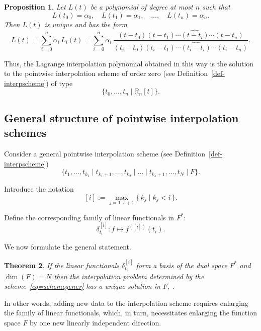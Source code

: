 \documentclass{article}
\newtheorem{theorem}{Theorem}[section]
\newtheorem{proposition}[theorem]{Proposition}	%
\theoremstyle{definition}
\theoremstyle{definition}
\numberwithin{figure}{section}
\newcommand{\1}{\mathbf{1}}
\begin{document}
\begin{proposition}\label{prop-Lagrpoly}
Let $L(t)$ be a polynomial of degree at most $n$ such that
\[
    L(t_0) = \alpha_0,\quad
    L(t_1) = \alpha_1,\quad
    \ldots,\quad
    L(t_n) = \alpha_n.
\]
Then $L(t)$ is unique and has the form
\[
    L(t)
    = \sum_{i=0}^n \alpha_i\, L_i(t)
    = \sum_{i=0}^n
        \alpha_i\,
        \frac{
            (t - t_0)(t - t_1)\cdots \widehat{(t - t_i)} \cdots (t - t_n)
        }{
            (t_i - t_0)(t_i - t_1)\cdots \widehat{(t_i - t_i)} \cdots (t_i - t_n)
        }.
\]
\end{proposition}

Thus, the Lagrange interpolation polynomial obtained in this way is the solution to the pointwise interpolation scheme of order zero (see Definition~\ref{def-interpscheme}) of type
\[
    \{t_0, \ldots, t_n \mid \mathbb{R}_n[t]\}.
\]

\subsection{General structure of pointwise interpolation schemes}\label{sec-generalschemeproperties}

Consider a general pointwise interpolation scheme (see Definition~\ref{def-interpscheme})
\begin{equation}\label{eq=schemegener}
     \{t_1,\ldots, t_{k_1}\mid t_{k_1+1},\ldots ,t_{k_2}\mid \ldots \mid t_{k_s+1},\ldots, t_{N} \mid F\}.
\end{equation}

Introduce the notation
\[
    [i] := \max_{j=1..s+1}\{\,k_j \mid k_j < i\,\}.
\]

Define the corresponding family of linear functionals in $F^*$:
\begin{equation}
    \delta^{[i]}_{t_i}\colon f \mapsto f^{([i])}(t_i).
\end{equation}

We now formulate the general statement.

\begin{theorem}\label{th-schemegeneral}
    If the linear functionals $\delta^{[i]}_{t_i}$ form a basis of the dual space $F^*$ and  $\dim(F)=N$ then the interpolation problem determined by the scheme~\eqref{eq=schemegener} has a unique solution in $F$, .
\end{theorem}

In other words, adding new data to the interpolation scheme requires enlarging the family of linear functionals, which, in turn, necessitates enlarging the function space $F$ by one new linearly independent direction.
\end{document}
